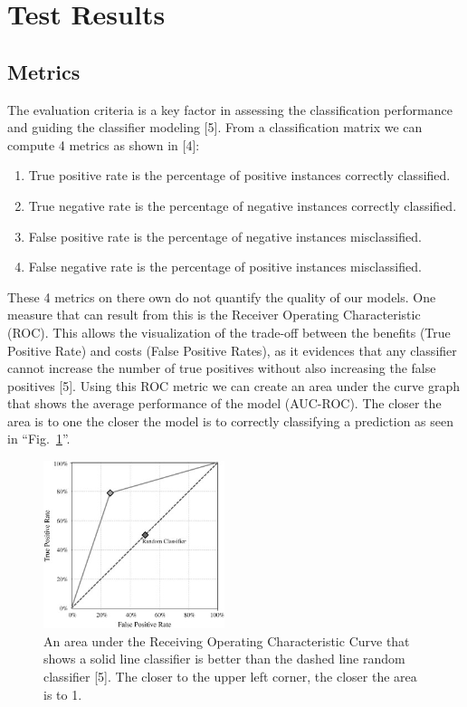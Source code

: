 \documentclass[Dealing with Imbalance in Computer Vision]{IEEEtran}
\begin{document}
\section{Test Results}
\subsection{Metrics}
The evaluation criteria is a key factor in assessing the classification performance and guiding the classifier modeling [5]. From a classification matrix we can compute 4 metrics as shown in [4]:
\begin{enumerate}
    \item True positive rate is the percentage of positive instances correctly classified.
    \item True negative rate is the percentage of negative instances correctly classified.
    \item False positive rate is the percentage of negative instances misclassified.
    \item False negative rate is the percentage of positive instances misclassified. 
\end{enumerate}

These 4 metrics on there own do not quantify the quality of our models. One measure that can result from this is the Receiver Operating Characteristic (ROC). This allows the visualization of the trade-off between the benefits (True Positive Rate) and costs (False Positive Rates), as it evidences that any classifier cannot increase the number of true positives without also increasing the false positives [5]. Using this ROC metric we can create an area under the curve graph that shows the average performance of the model (AUC-ROC). The closer the area is to one the closer the model is to correctly classifying a prediction as seen in ``Fig.~\ref{fig4}''.

\begin{figure}[]
\centerline{\includegraphics[width=200px]{AUC_ROC.jpg}}
\caption{An area under the Receiving Operating Characteristic Curve that shows a solid line classifier is better than the dashed line random classifier [5]. The closer to the upper left corner, the closer the area is to 1.}
\label{fig4}
\end{figure}
\end{document}
